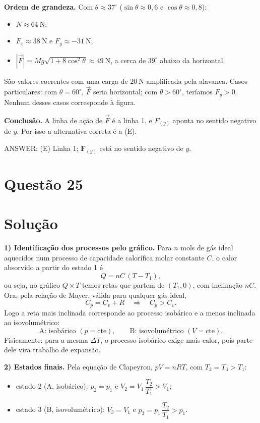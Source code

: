 \documentclass{article}%
\begin{document}
\textbf{Ordem de grandeza.} Com $\theta\approx 37^\circ$ ($\sin\theta\approx 0{,}6$ e $\cos\theta\approx 0{,}8$):
\begin{itemize}
\item $N\approx 64\ \text{N}$;
\item $F_x\approx 38\ \text{N}$ e $F_y\approx -31\ \text{N}$;
\item $|\vec F| = Mg\sqrt{1+8\cos^2\theta}\approx 49\ \text{N}$, a cerca de $39^\circ$ abaixo da horizontal.
\end{itemize}
São valores coerentes com uma carga de $20\ \text{N}$ amplificada pela alavanca. Casos particulares: com $\theta=60^\circ$, $\vec F$ seria horizontal; com $\theta>60^\circ$, teríamos $F_y>0$. Nenhum desses casos corresponde à figura.

\textbf{Conclusão.} A linha de ação de $\vec F$ é a linha 1, e $F_{(y)}$ aponta no sentido negativo de $y$. Por isso a alternativa correta é a (E).

ANSWER: (E) Linha 1; $\mathbf{F}_{(y)}$ está no sentido negativo de $y$.%
\newpage%
\section*{Questão 25}

\section*{Solução}

\textbf{1) Identificação dos processos pelo gráfico.} Para $n$ mols de gás ideal aquecidos num processo de capacidade calorífica molar constante $C$, o calor absorvido a partir do estado 1 é
\[
Q = nC\,(T - T_1),
\]
ou seja, no gráfico $Q\times T$ temos retas que partem de $(T_1,0)$, com inclinação $nC$. Ora, pela relação de Mayer, válida para qualquer gás ideal,
\[
C_p = C_v + R \quad\Longrightarrow\quad C_p > C_v .
\]
Logo a reta mais inclinada corresponde ao processo isobárico e a menos inclinada ao isovolumétrico:
\[
\text{A: isobárico } (p=\text{cte}), \qquad \text{B: isovolumétrico } (V=\text{cte}).
\]
Fisicamente: para a mesma $\Delta T$, o processo isobárico exige mais calor, pois parte dele vira trabalho de expansão.

\textbf{2) Estados finais.} Pela equação de Clapeyron, $pV = nRT$, com $T_2 = T_3 > T_1$:
\begin{itemize}
\item estado 2 (A, isobárico): $p_2 = p_1$ e $V_2 = V_1\,\dfrac{T_2}{T_1} > V_1$;
\item estado 3 (B, isovolumétrico): $V_3 = V_1$ e $p_3 = p_1\,\dfrac{T_2}{T_1} > p_1$.
\end{itemize}
\end{document}
